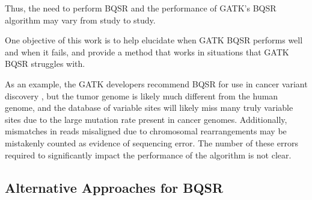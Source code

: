 \documentclass{article}
\begin{document}
\begin{outline}
\begin{outline}
		\item Thus, the need to perform BQSR and the performance of GATK's BQSR algorithm may vary from study to study.
		\item One objective of this work is to help elucidate when GATK BQSR performs well and when it fails, and provide a method that works in situations that GATK BQSR struggles with.
		\item As an example, the GATK developers recommend BQSR for use in cancer variant discovery \parencite{cibulskis_sensitive_2013}, but the tumor genome is likely much different from the human genome, and the database of variable sites will likely miss many truly variable sites due to the large mutation rate present in cancer genomes. Additionally, mismatches in reads misaligned due to chromosomal rearrangements may be mistakenly counted as evidence of sequencing error. The number of these errors required to significantly impact the performance of the algorithm is not clear.
	\end{outline}
\end{outline}

\subsection{Alternative Approaches for BQSR}
\end{document}
